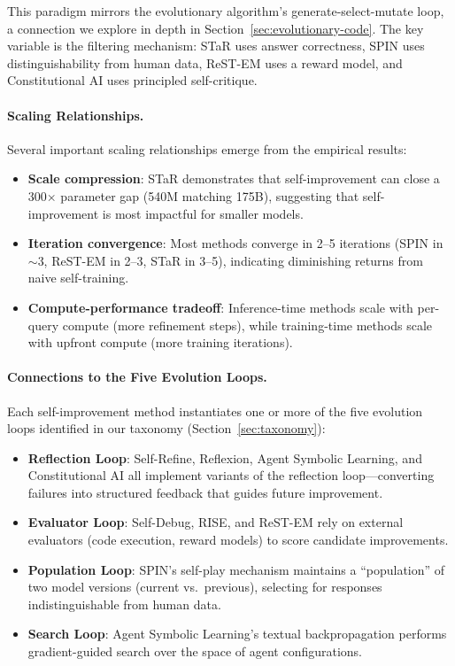 This paradigm mirrors the evolutionary algorithm's generate-select-mutate loop, a connection we explore in depth in Section~\ref{sec:evolutionary-code}. The key variable is the filtering mechanism: STaR uses answer correctness, SPIN uses distinguishability from human data, ReST-EM uses a reward model, and Constitutional AI uses principled self-critique.

\paragraph{Scaling Relationships.}
Several important scaling relationships emerge from the empirical results:

\begin{itemize}
    \item \textbf{Scale compression}: STaR demonstrates that self-improvement can close a 300$\times$ parameter gap (540M matching 175B), suggesting that self-improvement is most impactful for smaller models.
    \item \textbf{Iteration convergence}: Most methods converge in 2--5 iterations (SPIN in $\sim$3, ReST-EM in 2--3, STaR in 3--5), indicating diminishing returns from naive self-training.
    \item \textbf{Compute-performance tradeoff}: Inference-time methods scale with per-query compute (more refinement steps), while training-time methods scale with upfront compute (more training iterations).
\end{itemize}

\paragraph{Connections to the Five Evolution Loops.}
Each self-improvement method instantiates one or more of the five evolution loops identified in our taxonomy (Section~\ref{sec:taxonomy}):

\begin{itemize}
    \item \textbf{Reflection Loop}: Self-Refine, Reflexion, Agent Symbolic Learning, and Constitutional AI all implement variants of the reflection loop---converting failures into structured feedback that guides future improvement.
    \item \textbf{Evaluator Loop}: Self-Debug, RISE, and ReST-EM rely on external evaluators (code execution, reward models) to score candidate improvements.
    \item \textbf{Population Loop}: SPIN's self-play mechanism maintains a ``population'' of two model versions (current vs.\ previous), selecting for responses indistinguishable from human data.
    \item \textbf{Search Loop}: Agent Symbolic Learning's textual backpropagation performs gradient-guided search over the space of agent configurations.
\end{itemize}


